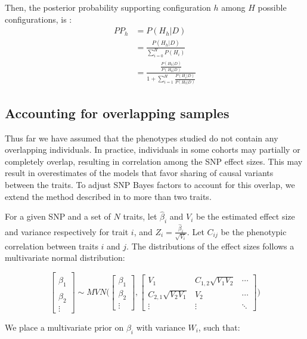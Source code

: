 \documentclass{article}
\begin{document}
Then, the posterior probability supporting configuration $h$ among $H$ possible configurations, is \citep{Giambartolomei:2014aa}:
\begin{align}
PP_h &= P(H_h | D) \\
&= \frac{P(H_h | D)}{\sum_{i=0}^H P(H_i)} \\
&= \frac{\frac{P(H_h | D)}{P(H_0|D)}}{1 + \sum_{i=1}^H \frac{P(H_i|D)}{P(H_0|D)}}
\end{align}

\subsection{Accounting for overlapping samples}
Thus far we have assumed that the phenotypes studied do not contain any overlapping individuals. In practice, individuals in some cohorts may partially or completely overlap, resulting in correlation among the SNP effect sizes. This may result in overestimates of the models that favor sharing of causal variants between the traits. To adjust SNP Bayes factors to account for this overlap, we extend the method described in \cite{Pickrell:2016aa} to more than two traits.

For a given SNP and a set of $N$ traits, let $\hat{\beta}_i$ and $V_i$ be the estimated effect size and variance respectively for trait $i$, and $Z_i = \frac{\hat{\beta}_i}{\sqrt{V_i}}$. Let $C_{ij}$ be the phenotypic correlation between traits $i$ and $j$. The distributions of the effect sizes follows a multivariate normal distribution:

\begin{equation}
\begin{bmatrix}
\hat{\beta}_1 \\
\hat{\beta}_2 \\
\vdots
\end{bmatrix}
\sim MVN \Bigg(
\begin{bmatrix}
\beta_1 \\
\beta_2 \\
\vdots
\end{bmatrix},
\begin{bmatrix}
V_1 & C_{1,2} \sqrt{V_1 V_2} & \cdots \\
C_{2,1} \sqrt{V_2 V_1} & V_2 & \cdots \\
\vdots & \vdots & \ddots
\end{bmatrix}
\Bigg)
\end{equation}

\noindent We place a multivariate prior on $\beta_i$ with variance $W_i$, such that:
\end{document}
